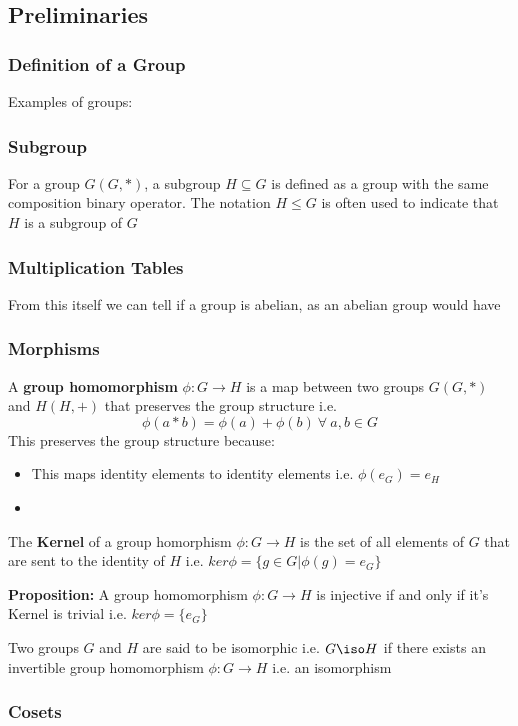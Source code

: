 \subsection{Preliminaries}
\subsubsection{Definition of a Group}
Examples of groups: 
\subsubsection{Subgroup}
For a group $G(G, *)$, a subgroup $H \subseteq G$ is defined as a group with the same composition binary operator. The notation $H \leq G$ is often used to indicate that $H$ is a subgroup of $G$
\subsubsection{Multiplication Tables}
From this itself we can tell if a group is abelian, as an abelian group would have 
\subsubsection{Morphisms}
A \textbf{group homomorphism} $\phi : G \rightarrow H$ is a map between two groups $G(G, *)$ and $H(H, +)$ that preserves the group structure i.e.
\begin{equation}
    \phi(a * b) = \phi(a) + \phi(b) \ \forall \  a,b \in G
\end{equation}
This preserves the group structure because:
\begin{itemize}
    \item This maps identity elements to identity elements i.e. $\phi(e_G) = e_{H}$
    \item 
\end{itemize}
The \textbf{Kernel} of a group homorphism $\phi : G \rightarrow H$ is the set of all elements of $G$ that are sent to the identity of $H$ i.e. $ker\phi = \{ g \in G | \phi(g) = e_{G}\}$
\begin{tcolorbox}
\textbf{Proposition:} A group homomorphism $\phi: G \rightarrow H$ is injective if and only if it's Kernel is trivial i.e. $ker\phi = \{ e_{G} \}$
\end{tcolorbox}
Two groups $G$ and $H$ are said to be isomorphic i.e. $G \iso H$ if there exists an invertible group homomorphism $\phi : G \rightarrow H$ i.e. an isomorphism

\subsubsection{Cosets}
